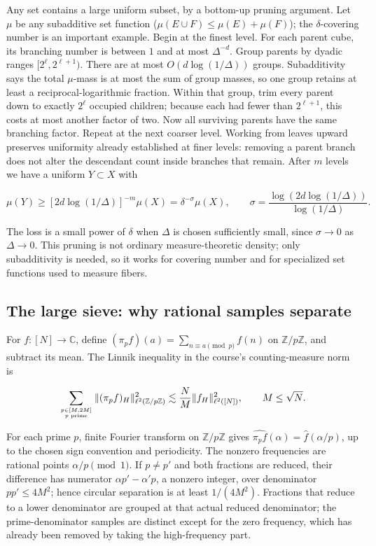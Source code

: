 Any set contains a large uniform subset, by a bottom-up pruning argument. Let \(\mu\) be any subadditive set function (\(\mu(E\cup F)\le\mu(E)+\mu(F)\)); the \(\delta\)-covering number is an important example. Begin at the finest level. For each parent cube, its branching number is between \(1\) and at most \(\Delta^{-d}\). Group parents by dyadic ranges \([2^\ell,2^{\ell+1})\). There are at most \(O(d\log(1/\Delta))\) groups. Subadditivity says the total \(\mu\)-mass is at most the sum of group masses, so one group retains at least a reciprocal-logarithmic fraction. Within that group, trim every parent down to exactly \(2^\ell\) occupied children; because each had fewer than \(2^{\ell+1}\), this costs at most another factor of two. Now all surviving parents have the same branching factor. Repeat at the next coarser level. Working from leaves upward preserves uniformity already established at finer levels: removing a parent branch does not alter the descendant count inside branches that remain. After \(m\) levels we have a uniform \(Y\subset X\) with

\[\mu(Y)\ge [2d\log(1/\Delta)]^{-m}\mu(X)=\delta^{-\sigma}\mu(X),\qquad \sigma=\frac{\log(2d\log(1/\Delta))}{\log(1/\Delta)}.\]

The loss is a small power of \(\delta\) when \(\Delta\) is chosen sufficiently small, since \(\sigma\to0\) as \(\Delta\to0\). This pruning is not ordinary measure-theoretic density; only subadditivity is needed, so it works for covering number and for specialized set functions used to measure fibers.

\subsection{The large sieve: why rational samples separate}\label{04-visual-computing-ii-ch033-the-large-sieve-why-rational-samples-separate}

For \(f:[N]\to\mathbb C\), define \((\pi_pf)(a)=\sum_{n\equiv a\pmod p}f(n)\) on \(\mathbb Z/p\mathbb Z\), and subtract its mean. The Linnik inequality in the course's counting-measure norm is

\[\sum_{p\in[M,2M]\atop p\text{ prime}}\|(\pi_pf)_H\|_{\ell^2(\mathbb Z/p\mathbb Z)}^2\lesssim \frac{N}{M}\|f_H\|_{\ell^2([N])}^2,\qquad M\le\sqrt N.\]

For each prime \(p\), finite Fourier transform on \(\mathbb Z/p\mathbb Z\) gives \(\widehat{\pi_pf}(\alpha)=\widehat f(\alpha/p)\), up to the chosen sign convention and periodicity. The nonzero frequencies are rational points \(\alpha/p\pmod1\). If \(p\ne p'\) and both fractions are reduced, their difference has numerator \(\alpha p'-\alpha'p\), a nonzero integer, over denominator \(pp'\le4M^2\); hence circular separation is at least \(1/(4M^2)\). Fractions that reduce to a lower denominator are grouped at that actual reduced denominator; the prime-denominator samples are distinct except for the zero frequency, which has already been removed by taking the high-frequency part.

